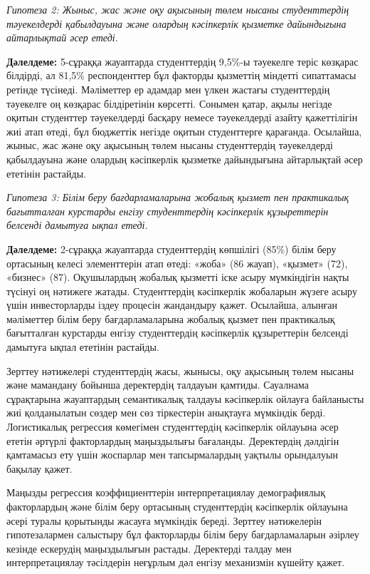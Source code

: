 \emph{Гипотеза 2: Жыныс, жас және оқу ақысының төлем нысаны
студенттердің тәуекелдерді қабылдауына және олардың кәсіпкерлік қызметке
дайындығына айтарлықтай әсер етеді.}

{\bfseries Дәлелдеме:} 5-сұраққа жауаптарда студенттердің 9,5\%-ы тәуекелге
теріс көзқарас білдірді, ал 81,5\% респонденттер бұл факторды қызметтің
міндетті сипаттамасы ретінде түсінеді. Мәліметтер ер адамдар мен үлкен
жастағы студенттердің тәуекелге оң көзқарас білдіретінін көрсетті.
Сонымен қатар, ақылы негізде оқитын студенттер тәуекелдерді басқару
немесе тәуекелдерді азайту қажеттілігін жиі атап өтеді, бұл бюджеттік
негізде оқитын студенттерге қарағанда. Осылайша, жыныс, жас және оқу
ақысының төлем нысаны студенттердің тәуекелдерді қабылдауына және
олардың кәсіпкерлік қызметке дайындығына айтарлықтай әсер ететінін
растайды.

\emph{Гипотеза 3: Білім беру бағдарламаларына жобалық қызмет пен
практикалық бағытталған курстарды енгізу студенттердің кәсіпкерлік
құзыреттерін белсенді дамытуға ықпал етеді.}

{\bfseries Дәлелдеме:} 2-сұраққа жауаптарда студенттердің көпшілігі (85\%)
білім беру ортасының келесі элементтерін атап өтеді: «жоба» (86 жауап),
«қызмет» (72), «бизнес» (87). Оқушылардың жобалық қызметті іске асыру
мүмкіндігін нақты түсінуі оң нәтижеге жатады. Студенттердің кәсіпкерлік
жобаларын жүзеге асыру үшін инвесторларды іздеу процесін жандандыру
қажет. Осылайша, алынған мәліметтер білім беру бағдарламаларына жобалық
қызмет пен практикалық бағытталған курстарды енгізу студенттердің
кәсіпкерлік құзыреттерін белсенді дамытуға ықпал ететінін растайды.

Зерттеу нәтижелері студенттердің жасы, жынысы, оқу ақысының төлем нысаны
және мамандану бойынша деректердің талдауын қамтиды. Сауалнама
сұрақтарына жауаптардың семантикалық талдауы кәсіпкерлік ойлауға
байланысты жиі қолданылатын сөздер мен сөз тіркестерін анықтауға
мүмкіндік берді. Логистикалық регрессия көмегімен студенттердің
кәсіпкерлік ойлауына әсер ететін әртүрлі факторлардың маңыздылығы
бағаланды. Деректердің дәлдігін қамтамасыз ету үшін жоспарлар мен
тапсырмалардың уақтылы орындалуын бақылау қажет.

Маңызды регрессия коэффициенттерін интерпретациялау демографиялық
факторлардың және білім беру ортасының студенттердің кәсіпкерлік
ойлауына әсері туралы қорытынды жасауға мүмкіндік береді. Зерттеу
нәтижелерін гипотезалармен салыстыру бұл факторларды білім беру
бағдарламаларын әзірлеу кезінде ескерудің маңыздылығын растады.
Деректерді талдау мен интерпретациялау тәсілдерін неғұрлым дәл енгізу
механизмін күшейту қажет.

